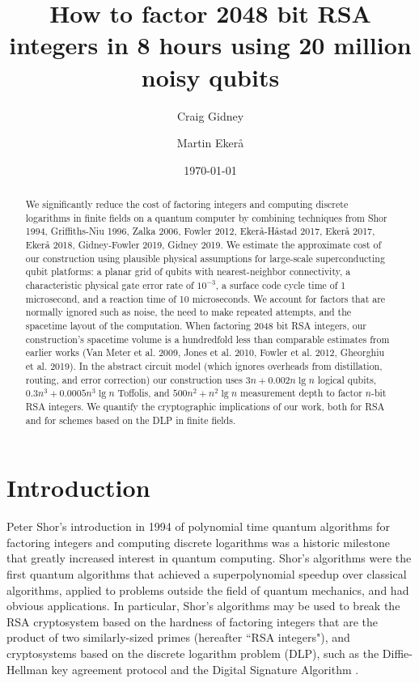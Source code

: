 \documentclass[superscriptaddress,notitlepage,longbibliography]{revtex4-1}
\theoremstyle{definition}
\theoremstyle{definition}
\begin{document}
\title{How to factor 2048 bit RSA integers in 8 hours using 20 million noisy qubits}

\date{\today}
\author{Craig Gidney}
\author{Martin Ekerå}

\begin{abstract}
We significantly reduce the cost of factoring integers and computing discrete logarithms in finite fields on a quantum computer by combining techniques from Shor 1994, Griffiths-Niu 1996, Zalka 2006, Fowler 2012, Ekerå-Håstad 2017, Ekerå 2017, Ekerå 2018, Gidney-Fowler 2019, Gidney 2019.
We estimate the approximate cost of our construction using plausible physical assumptions for large-scale superconducting qubit platforms:
 a planar grid of qubits with nearest-neighbor connectivity,
 a characteristic physical gate error rate of $10^{-3}$,
 a surface code cycle time of 1 microsecond,
 and a reaction time of 10 microseconds.
We account for factors that are normally ignored such as noise, the need to make repeated attempts, and the spacetime layout of the computation.
When factoring 2048 bit RSA integers, our construction's spacetime volume is a hundredfold less than comparable estimates from earlier works (Van Meter et al. 2009, Jones et al. 2010, Fowler et al. 2012, Gheorghiu et al. 2019).
In the abstract circuit model (which ignores overheads from distillation, routing, and error correction) our construction uses $3 n + 0.002 n \lg n$ logical qubits, $0.3 n^3 + 0.0005 n^3 \lg n$ Toffolis, and $500 n^2 + n^2 \lg n$ measurement depth to factor $n$-bit RSA integers.
We quantify the cryptographic implications of our work, both for RSA and for schemes based on the DLP in finite fields.
\end{abstract}

\maketitle

\section{Introduction}
\label{sec:introduction}
Peter Shor's introduction in 1994 of polynomial time quantum algorithms for factoring integers and computing discrete logarithms \cite{shor1994,Timeline} was a historic milestone that greatly increased interest in quantum computing.
Shor's algorithms were the first quantum algorithms that achieved a superpolynomial speedup over classical algorithms, applied to problems outside the field of quantum mechanics, and had obvious applications.
In particular, Shor's algorithms may be used to break the RSA cryptosystem \cite{rsa} based on the hardness of factoring integers that are the product of two similarly-sized primes (hereafter ``RSA integers"), and cryptosystems based on the discrete logarithm problem (DLP), such as the Diffie-Hellman key agreement protocol \cite{diffie-hellman} and the Digital Signature Algorithm \cite{fips-186-4}.
\end{document}
